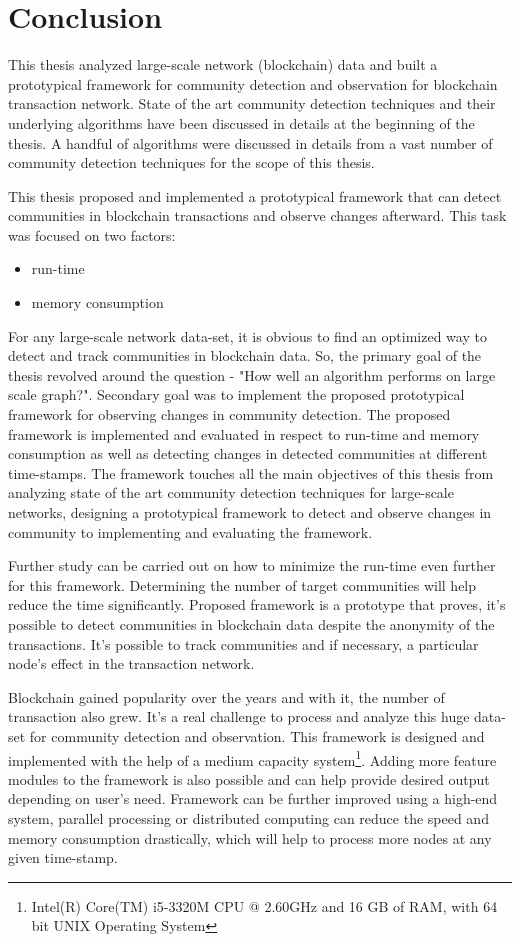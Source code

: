\chapter{Conclusion}\label{cha:conclusion}

This thesis analyzed large-scale network (blockchain) data and built a prototypical framework for community detection and observation for blockchain transaction network. State of the art community detection techniques and their underlying algorithms have been discussed in details at the beginning of the thesis. A handful of algorithms were discussed in details from a vast number of community detection techniques for the scope of this thesis.

This thesis proposed and implemented a prototypical framework that can detect communities in blockchain transactions and observe changes afterward. This task was focused on two factors: 
\begin{itemize}
	\item run-time
	\item memory consumption
\end{itemize}
\noindent For any large-scale network data-set, it is obvious to find an optimized way to detect and track communities in blockchain data. So, the primary goal of the thesis revolved around the question - "How well an algorithm performs on large scale graph?". Secondary goal was to implement the proposed prototypical framework for observing changes in community detection. The proposed framework is implemented and evaluated in respect to run-time and memory consumption as well as detecting changes in detected communities at different time-stamps. The framework touches all the main objectives of this thesis from analyzing state of the art community detection techniques for large-scale networks, designing a prototypical framework to detect and observe changes in community to implementing and evaluating the framework.

Further study can be carried out on how to minimize the run-time even further for this framework. Determining the number of target communities will help reduce the time significantly. Proposed framework is a prototype that proves, it's possible to detect communities in blockchain data despite the anonymity of the transactions. It's possible to track communities and if necessary, a particular node's effect in the transaction network.

Blockchain gained popularity over the years and with it, the number of transaction also grew. It's a real challenge to process and analyze this huge data-set for community detection and observation. This framework is designed and implemented with the help of a medium capacity system\footnote{Intel(R) Core(TM) i5-3320M CPU @ 2.60GHz and 16 GB of RAM, with 64 bit UNIX Operating System}. Adding more feature modules to the framework is also possible and can help provide desired output depending on user's need. Framework can be further improved using a high-end system, parallel processing or distributed computing can reduce the speed and memory consumption drastically, which will help to process more nodes at any given time-stamp.

